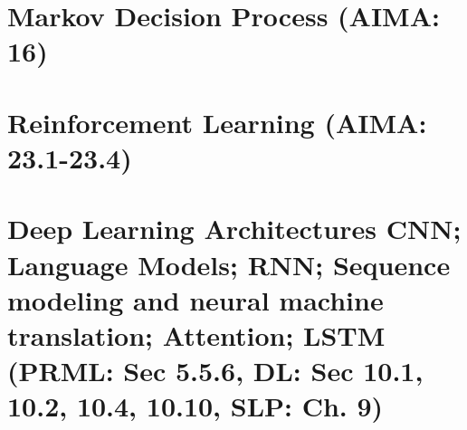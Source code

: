 \documentclass{article}
\begin{document}
\section{Markov Decision Process (AIMA: 16)}


\section{Reinforcement Learning (AIMA: 23.1-23.4)}


\section{Deep Learning Architectures CNN; Language Models; RNN; Sequence modeling and neural machine translation; Attention; LSTM (PRML: Sec 5.5.6, DL: Sec 10.1, 10.2, 10.4, 10.10, SLP: Ch. 9)}

\end{document}
